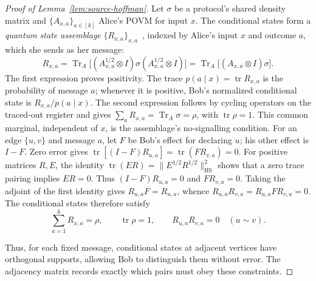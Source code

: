 \documentclass[11pt,a4paper]{article}
\numberwithin{equation}{section}
\numberwithin{figure}{section}
\numberwithin{table}{section}
\numberwithin{footnote}{section}
\theoremstyle{informal}\newtheorem*{informaltheorem}{Informal theorem}
\theoremstyle{definition}\newtheorem{example}{Example}[section]
\theoremstyle{remark}\newtheorem{remark}[theorem]{Remark}
\newcommand{\tr}{\operatorname{tr}}
\newcommand{\HS}{\mathrm{HS}}
\begin{document}
\begin{proof}[Proof of Lemma~\ref{lem:source-hoffman}]
Let \(\sigma\) be a protocol's shared density matrix and
\(\{A_{x,a}\}_{a\in[k]}\) Alice's POVM for input \(x\).
The conditional states form a \emph{quantum state assemblage}
\(\{R_{x,a}\}_{x,a}\)~\cite[Sec.~II]{cs-steering}, indexed by Alice's
input \(x\) and outcome \(a\), which she sends as her message:
\begin{equation}\label{eq:source-conditional-states}
 R_{x,a}=\operatorname{Tr}_A\bigl[
 (A_{x,a}^{1/2}\otimes I)\sigma(A_{x,a}^{1/2}\otimes I)\bigr]
 =\operatorname{Tr}_A\bigl[(A_{x,a}\otimes I)\sigma\bigr].
\end{equation}
The first expression proves positivity.
The trace \(p(a\mid x)=\tr R_{x,a}\) is the probability of
message \(a\); whenever it is positive, Bob's normalized conditional
state is \(R_{x,a}/p(a\mid x)\).
The second expression follows by
cycling operators on the traced-out register and gives
\(\sum_aR_{x,a}=\operatorname{Tr}_A\sigma=\rho\), with
\(\tr\rho=1\). This common marginal, independent of \(x\), is
the assemblage's no-signalling condition.
For an edge \(\{u,v\}\) and message \(a\), let \(F\) be Bob's
effect for declaring \(u\); his other effect is \(I-F\).
Zero error gives
\(\tr[(I-F)R_{u,a}]=\tr(FR_{v,a})=0\).
For positive matrices \(R,E\), the identity
\(\tr(ER)=\|E^{1/2}R^{1/2}\|_{\HS}^2\) shows that a zero trace
pairing implies \(ER=0\). Thus
\((I-F)R_{u,a}=0\) and \(FR_{v,a}=0\). Taking the adjoint of
the first identity gives \(R_{u,a}F=R_{u,a}\), whence
\(R_{u,a}R_{v,a}=R_{u,a}FR_{v,a}=0\).
The conditional states therefore satisfy
\begin{equation}\label{eq:source-ensembles}
 \sum_{a=1}^k R_{x,a}=\rho,\qquad
 \tr\rho=1,\qquad R_{u,a}R_{v,a}=0\quad(u\sim v).
\end{equation}

Thus, for each fixed message, conditional states at adjacent vertices
have orthogonal supports, allowing Bob to distinguish them without
error. The adjacency matrix records exactly which pairs must obey these
constraints.


\end{proof}
\end{document}
